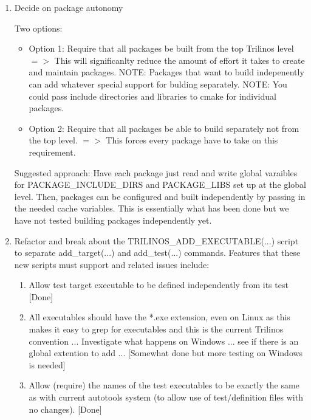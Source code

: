 \documentclass[pdf,ps2pdf,11pt]{SANDreport}
\begin{document}
\begin{enumerate}

{}\item Decide on package autonomy

Two options:

  \begin{itemize}

  {}\item Option 1: Require that all packages be built from the top
  Trilinos level $=>$ This will significanlty reduce the amount of
  effort it takes to create and maintain packages.  NOTE: Packages
  that want to build indepenently can add whatever special support for
  bulding separately.  NOTE: You could pass include directories and
  libraries to cmake for individual packages.

  {}\item Option 2: Require that all packages be able to build
  separately not from the top level. $=>$ This forces every package
  have to take on this requirement.

  \end{itemize}

Suggested approach: Have each package just read and write global
varaibles for PACKAGE\_INCLUDE\_DIRS and PACKAGE\_LIBS set up at the
global level.  Then, packages can be configured and built
independently by passing in the needed cache variables.  This is
essentially what has been done but we have not tested building
packages independently yet.

{}\item Refactor and break about the TRILINOS\_ADD\_EXECUTABLE(...) 
script to separate add\_target(...) and add\_test(...) commands.
Features that these new scripts must support and related issues
include:

  \begin{enumerate}

  {}\item Allow test target executable to be defined independently
  from its test [Done]

  {}\item All executables should have the *.exe extension, even on
  Linux as this makes it easy to grep for executables and this is the
  current Trilinos convention ... Investigate what happens on Windows
  ... see if there is an global extention to add ... [Somewhat done
  but more testing on Windows is needed]

  {}\item Allow (require) the names of the test executables to be
  exactly the same as with current autotools system (to allow use of
  test/definition files with no changes). [Done]


\end{enumerate}
\end{enumerate}
\end{document}
